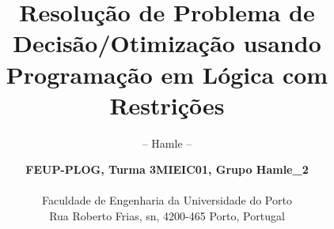 \documentclass[envcountsame,envcountchap]{svmono}
\begin{document}
\author{\textbf{FEUP-PLOG, Turma 3MIEIC01, Grupo Hamle\_2}\\ \\
	\normalsize Faculdade de Engenharia da Universidade do Porto \\ 
	\small Rua Roberto Frias, s\/n, 4200-465 Porto, Portugal }

\title{Resolu\c{c}\~ao de Problema de Decis\~ao/Otimiza\c{c}\~ao usando
	Programa\c{c}\~ao em L\'ogica com Restri\c{c}\~oes}
\subtitle{-- Hamle --}


\maketitle



\frontmatter%


\let\cleardoublepage\clearpage
\tableofcontents

\mainmatter%



%
%

\backmatter%
%

\printindex

\end{document}
